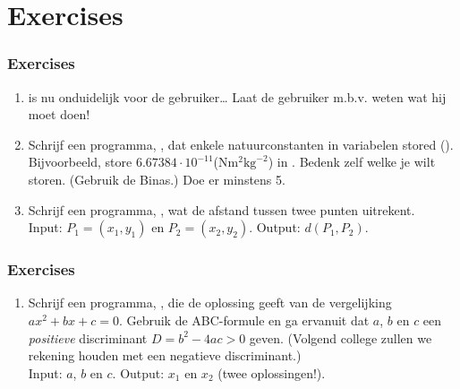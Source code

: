 \section{Exercises}

\begin{frame}
\frametitle{Exercises}

\begin{enumerate}
  \item {} is nu onduidelijk voor de gebruiker\ldots
  		Laat de gebruiker m.b.v.  weten wat hij moet doen!
  \item Schrijf een programma, , dat enkele natuurconstanten in variabelen stored (\tiSTO).
  		Bijvoorbeeld, store $6.67384\cdot10^{-11}$($\mathrm{N}\mathrm{m}^2\mathrm{kg}^{-2}$) in .
  		Bedenk zelf welke je wilt storen. (Gebruik de Binas.) Doe er minstens 5.
  \item Schrijf een programma, , wat de afstand tussen twee punten uitrekent. \\
  		Input: $P_1=(x_1,y_1)$ en $P_2=(x_2,y_2)$. Output: $d(P_1,P_2)$.
\end{enumerate}

\end{frame}

\begin{frame}
\frametitle{Exercises}

\begin{enumerate}
  \item Schrijf een programma, , die de oplossing geeft van de vergelijking $ax^2+bx+c=0$.
  		Gebruik de ABC-formule en ga ervanuit dat $a$, $b$ en $c$ een \emph{positieve} discriminant $D=b^2-4ac>0$ geven.
  		(Volgend college zullen we rekening houden met een negatieve discriminant.) \\
  		Input: $a$, $b$ en $c$. Output: $x_1$ en $x_2$ (twee oplossingen!).
\end{enumerate}

\end{frame}

